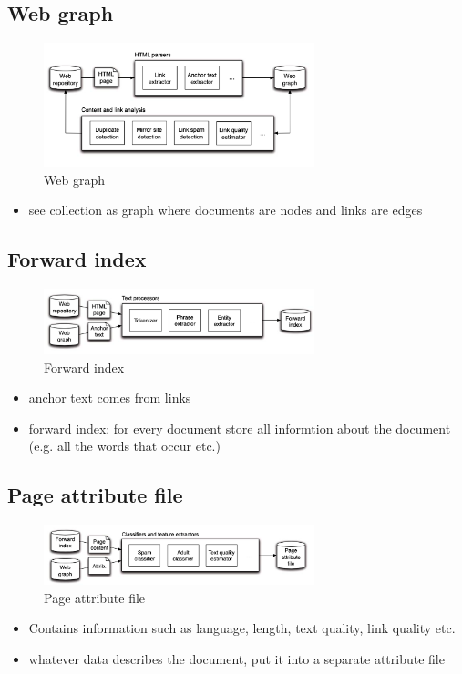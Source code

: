 \subsection{Web graph}
\begin{figure}[ht]
    \centering
    \includegraphics[width=0.7\textwidth]{figures/web_graph.png}
    \caption{Web graph}
\end{figure}
\begin{itemize}
    \item see collection as graph where documents are nodes and links are edges
\end{itemize}
\subsection{Forward index}
\begin{figure}[ht]
    \centering
    \includegraphics[width=0.7\textwidth]{figures/forward_index.png}
    \caption{Forward index}
\end{figure}
\begin{itemize}
    \item anchor text comes from links
    \item forward index: for every document store all informtion about the document (e.g. all the words that occur etc.)
\end{itemize}
\subsection{Page attribute file}
\begin{figure}[ht]
    \centering
    \includegraphics[width=0.7\textwidth]{figures/page_attribute_file.png}
    \caption{Page attribute file}
\end{figure}
\begin{itemize}
    \item Contains information such as language, length, text quality, link quality etc.
    \item whatever data describes the document, put it into a separate attribute file
\end{itemize}
